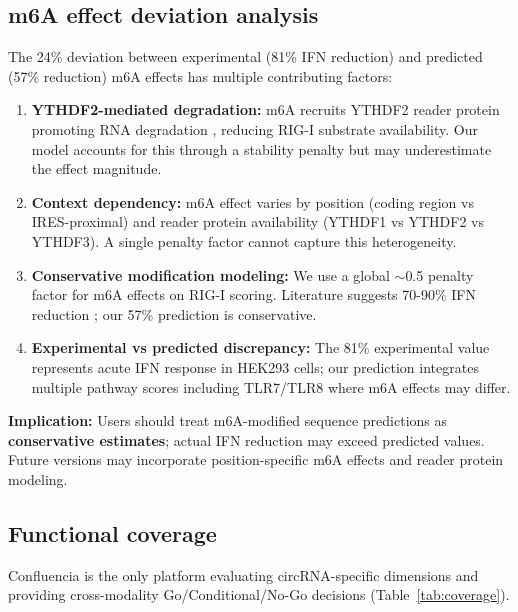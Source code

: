 \subsection*{m6A effect deviation analysis}
The 24\% deviation between experimental (81\% IFN reduction) and predicted (57\% reduction) m6A effects has multiple contributing factors:
\begin{enumerate}[noitemsep,topsep=0pt]
\item \textbf{YTHDF2-mediated degradation:} m6A recruits YTHDF2 reader protein promoting RNA degradation \citep{wang2014}, reducing RIG-I substrate availability. Our model accounts for this through a stability penalty but may underestimate the effect magnitude.
\item \textbf{Context dependency:} m6A effect varies by position (coding region vs IRES-proximal) and reader protein availability (YTHDF1 vs YTHDF2 vs YTHDF3). A single penalty factor cannot capture this heterogeneity.
\item \textbf{Conservative modification modeling:} We use a global $\sim$0.5 penalty factor for m6A effects on RIG-I scoring. Literature suggests 70-90\% IFN reduction \citep{chen2019}; our 57\% prediction is conservative.
\item \textbf{Experimental vs predicted discrepancy:} The 81\% experimental value represents acute IFN response in HEK293 cells; our prediction integrates multiple pathway scores including TLR7/TLR8 where m6A effects may differ.
\end{enumerate}
\textbf{Implication:} Users should treat m6A-modified sequence predictions as \textbf{conservative estimates}; actual IFN reduction may exceed predicted values. Future versions may incorporate position-specific m6A effects and reader protein modeling.

\subsection*{Functional coverage}
Confluencia is the only platform evaluating circRNA-specific dimensions and providing cross-modality Go/Conditional/No-Go decisions (Table~\ref{tab:coverage}).

